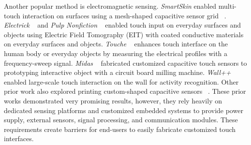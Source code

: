 
Another popular method is electromagnetic sensing. \textit{SmartSkin} enabled multi-touch interaction on surfaces using a mesh-shaped capacitive sensor grid ~\cite{Rekimoto-SmartSkin}. \textit{Electrick} ~\cite{Zhang-Electrick} and \textit{Pulp Nonfiction} ~\cite{Zhang-pulp} enabled touch input on everyday surfaces and objects using Electric Field Tomography (EIT) with coated conductive materials on everyday surfaces and objects. \textit{Touche} ~\cite{Sato-Touche} enhances touch interface on the human body or everyday objects by measuring the electrical profiles with a frequency-sweep signal. \textit{Midas} ~\cite{Savage-2012-Midas} fabricated customized capacitive touch sensors to prototyping interactive object with a circuit board milling machine. \textit{Wall++} ~\cite{Zhang-wall} enabled large-scale touch interaction on the wall for activity recognition. Other prior work also explored printing custom-shaped capacitive sensors ~\cite{gong2014printsense,olberding2015foldio,olberding2014printscreen,vadgama2017flexy}. These prior works demonstrated very promising results, however, they rely heavily on dedicated sensing platforms and customized embedded systems to provide power supply, external sensors, signal processing, and communication modules. These requirements create barriers for end-users to easily fabricate customized touch interfaces.

